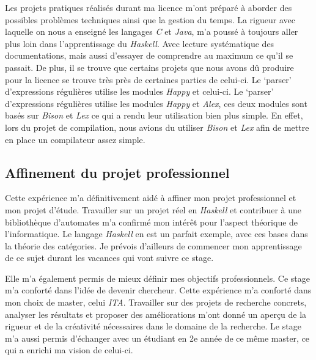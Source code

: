 \vphantom{}

Les projets pratiques réalisés durant ma licence m'ont préparé à aborder des 
possibles problèmes techniques ainsi que la gestion du temps. La rigueur avec 
laquelle on nous a enseigné les langages \textit{C} et \textit{Java}, m'a 
poussé à toujours aller plus loin dans l'apprentissage du \textit{Haskell}. Avec 
lecture systématique des documentations, mais aussi d'essayer de comprendre au 
maximum ce qu'il se passait. De plus, il se trouve que certains projets que nous 
avons dû produire pour la licence se trouve très près de certaines parties de 
celui-ci. Le `parser' d'expressions régulières utilise les modules \textit{Happy} et 
celui-ci. Le `parser' d'expressions régulières utilise les modules \textit{Happy} et 
\textit{Alex}, ces deux modules sont basés sur \textit{Bison} et \textit{Lex} ce 
qui a rendu leur utilisation bien plus simple. En effet, lors du projet de 
compilation, nous avions du utiliser \textit{Bison} et \textit{Lex} afin de 
mettre en place un compilateur assez simple. 

\subsection{Affinement du projet professionnel}

Cette expérience m'a définitivement aidé à affiner mon projet professionnel et 
mon projet d'étude. Travailler sur un projet réel en \textit{Haskell} et 
contribuer à une bibliothèque d'automates m'a confirmé mon intérêt pour l'aspect 
théorique de l'informatique. Le langage \textit{Haskell} en est un parfait 
exemple, avec ces bases dans la théorie des catégories. Je prévois d'ailleurs de 
commencer mon apprentissage de ce sujet durant les vacances qui vont suivre ce 
stage.

\vphantom{}

Elle m'a également permis de mieux définir mes objectifs professionnels. Ce 
stage m'a conforté dans l'idée de devenir chercheur. Cette expérience m'a 
conforté dans mon choix de master, celui \textit{ITA}. Travailler sur des 
projets de recherche concrets, analyser les résultats et proposer des 
améliorations m'ont donné un aperçu de la rigueur et de la créativité 
nécessaires dans le domaine de la recherche. Le stage m'a aussi permis 
d'échanger avec un étudiant en 2e année de ce même master, ce qui a enrichi ma 
vision de celui-ci.